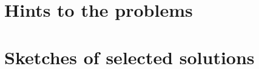 \chapter{Hints to the problems}
\begin{enumerate}
	
\end{enumerate}

\chapter{Sketches of selected solutions}
\begin{enumerate}
	
\end{enumerate}
